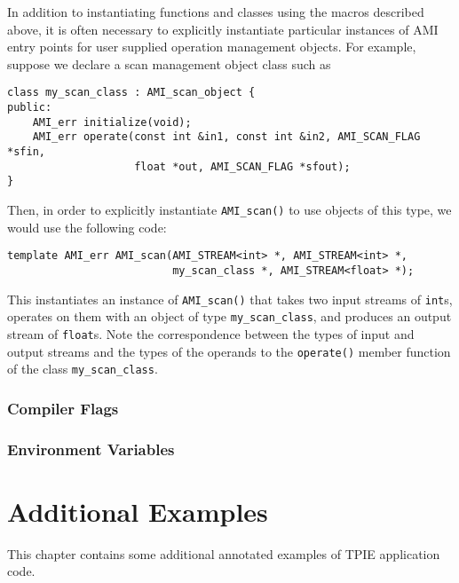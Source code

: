 In addition to instantiating functions and classes using the macros
described above, it is often necessary to explicitly instantiate
particular instances of AMI entry points for user supplied operation
management objects.  For example, suppose we declare a scan management
object class such as
\begin{verbatim}
class my_scan_class : AMI_scan_object {
public:
    AMI_err initialize(void);
    AMI_err operate(const int &in1, const int &in2, AMI_SCAN_FLAG *sfin,
                    float *out, AMI_SCAN_FLAG *sfout); 
}
\end{verbatim}
Then, in order to explicitly instantiate \verb|AMI_scan()| to use
objects of this type, we would use the following code:
\begin{verbatim}
template AMI_err AMI_scan(AMI_STREAM<int> *, AMI_STREAM<int> *, 
                          my_scan_class *, AMI_STREAM<float> *); 
\end{verbatim}
This instantiates an instance of \verb|AMI_scan()| that takes two input
streams of \verb|int|s, operates on them with an object of type
\verb|my_scan_class|, and produces an output stream of \verb|float|s.  
Note the correspondence between the types of input and output streams
and the types of the operands to the \verb|operate()| member function
of the class \verb|my_scan_class|.

\subsection{Compiler Flags}
\label{sec:comp-flags}


\subsection{Environment Variables}






\chapter{Additional Examples} \label{ch:examples}

This chapter contains some additional annotated examples of 
TPIE application code.

